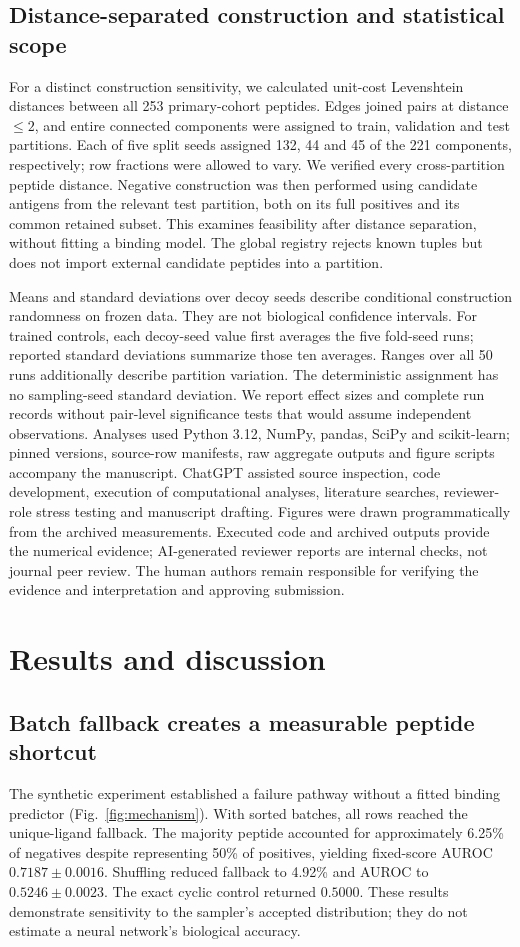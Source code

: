 \documentclass[pdflatex,sn-basic]{sn-jnl}
\begin{document}
\subsection{Distance-separated construction and statistical scope}
For a distinct construction sensitivity, we calculated unit-cost Levenshtein distances between all 253 primary-cohort peptides. Edges joined pairs at distance $\leq2$, and entire connected components were assigned to train, validation and test partitions. Each of five split seeds assigned 132, 44 and 45 of the 221 components, respectively; row fractions were allowed to vary. We verified every cross-partition peptide distance. Negative construction was then performed using candidate antigens from the relevant test partition, both on its full positives and its common retained subset. This examines feasibility after distance separation, without fitting a binding model. The global registry rejects known tuples but does not import external candidate peptides into a partition.

Means and standard deviations over decoy seeds describe conditional construction randomness on frozen data. They are not biological confidence intervals. For trained controls, each decoy-seed value first averages the five fold-seed runs; reported standard deviations summarize those ten averages. Ranges over all 50 runs additionally describe partition variation. The deterministic assignment has no sampling-seed standard deviation. We report effect sizes and complete run records without pair-level significance tests that would assume independent observations. Analyses used Python 3.12, NumPy, pandas, SciPy and scikit-learn; pinned versions, source-row manifests, raw aggregate outputs and figure scripts accompany the manuscript. ChatGPT assisted source inspection, code development, execution of computational analyses, literature searches, reviewer-role stress testing and manuscript drafting. Figures were drawn programmatically from the archived measurements. Executed code and archived outputs provide the numerical evidence; AI-generated reviewer reports are internal checks, not journal peer review. The human authors remain responsible for verifying the evidence and interpretation and approving submission.

\section{Results and discussion}\label{sec:results}
\subsection{Batch fallback creates a measurable peptide shortcut}
The synthetic experiment established a failure pathway without a fitted binding predictor (Fig.~\ref{fig:mechanism}). With sorted batches, all rows reached the unique-ligand fallback. The majority peptide accounted for approximately 6.25\% of negatives despite representing 50\% of positives, yielding fixed-score AUROC $0.7187\pm0.0016$. Shuffling reduced fallback to 4.92\% and AUROC to $0.5246\pm0.0023$. The exact cyclic control returned $0.5000$. These results demonstrate sensitivity to the sampler's accepted distribution; they do not estimate a neural network's biological accuracy.
\end{document}
